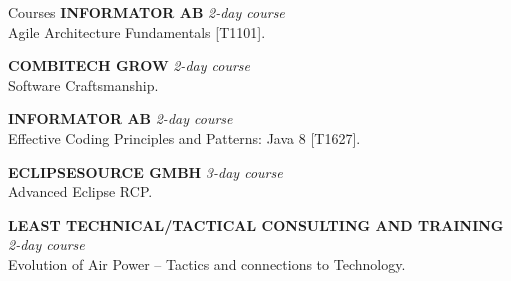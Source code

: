 \documentclass{resume}
\begin{document}
  \begin{rSection}{Courses}
  {\bf INFORMATOR AB}
    \hfill {\em 2-day course } \\
    { Agile Architecture Fundamentals [T1101]. } %

    {\bf COMBITECH GROW}
    \hfill {\em 2-day course } \\
    { Software Craftsmanship. } %

    {\bf INFORMATOR AB}
    \hfill {\em 2-day course } \\
    { Effective Coding Principles and Patterns: Java 8 [T1627]. } %

    {\bf ECLIPSESOURCE GMBH}
    \hfill {\em 3-day course } \\
    { Advanced Eclipse RCP. } %

    {\bf LEAST TECHNICAL/TACTICAL CONSULTING AND TRAINING}
    \hfill {\em 2-day course } \\
    { Evolution of Air Power – Tactics and connections to Technology. } %
  \end{rSection}
\end{document}
